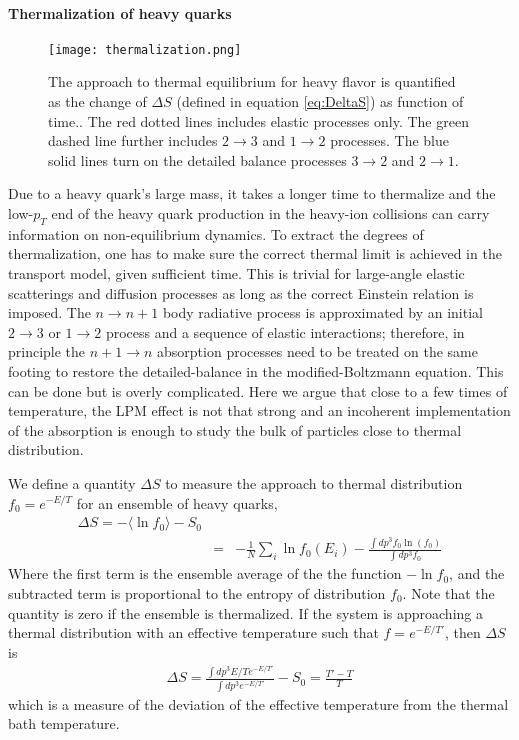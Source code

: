 \paragraph{Thermalization of heavy quarks}
\begin{figure}
\centering
\texttt{[image: thermalization.png]}
\caption{The approach to thermal equilibrium for heavy flavor is quantified as the change of $\Delta S$ (defined in equation \ref{eq:DeltaS}) as function of time.. The red dotted lines includes elastic processes only. The green dashed line further includes $2\rightarrow 3$ and $1\rightarrow 2$ processes. The blue solid lines turn on the detailed balance processes $3\rightarrow 2$ and $2\rightarrow 1$.}
\label{fig:thermalization}
\end{figure}
Due to a heavy quark's large mass, it takes a longer time to thermalize and the low-$p_T$ end of the heavy quark production in the heavy-ion collisions can carry information on non-equilibrium dynamics.
To extract the degrees of thermalization, one has to make sure the correct thermal limit is achieved in the transport model, given sufficient time.
This is trivial for large-angle elastic scatterings and diffusion processes as long as the correct Einstein relation is imposed.
The $n\rightarrow n+1$ body radiative process is approximated by an initial $2\rightarrow 3$ or $1\rightarrow 2$ process and a sequence of elastic interactions; therefore, in principle the $n+1\rightarrow n$ absorption processes need to be treated on the same footing to restore the detailed-balance in the modified-Boltzmann equation.
This can be done but is overly complicated.
Here we argue that close to a few times of temperature, the LPM effect is not that strong and an incoherent implementation of the absorption is enough to study the bulk of particles close to thermal distribution.

We define a quantity $\Delta S$ to measure the approach to thermal distribution $f_0 = e^{-E/T}$ for an ensemble of heavy quarks,
\begin{eqnarray}
\Delta S = - \langle \ln f_0 \rangle - S_0 \\
 &=& - \frac{1}{N}\sum_i\ln f_0(E_i) - \frac{\int dp^3 f_0 \ln(f_0)}{\int dp^3 f_0}
 \label{eq:DeltaS}
\end{eqnarray}
Where the first term is the ensemble average of the the function $-\ln f_0$, and the subtracted term is proportional to the entropy of distribution $f_0$.
Note that the quantity is zero if the ensemble is thermalized.
If the system is approaching a thermal distribution with an effective temperature such that $f = e^{-E/T'}$, then $\Delta S$ is 
\begin{eqnarray}
\Delta S = \frac{\int dp^3 E/T e^{-E/T'}}{\int dp^3 e^{-E/T'}} - S_0 = \frac{T'-T}{T}
\end{eqnarray}
which is a measure of the deviation of the effective temperature from the thermal bath temperature.

